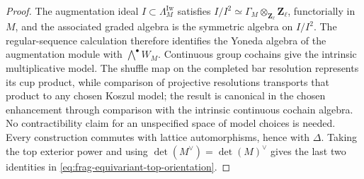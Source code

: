 \documentclass[11pt]{article}
\theoremstyle{definition}
\theoremstyle{remark}
\begin{document}
\begin{proof}
The augmentation ideal $I\subset\Lambda_M^{\mathrm{Iw}}$ satisfies
$I/I^2\simeq\Gamma_M\otimes_{\mathbf Z_\ell}\mathbf Z_\ell$, functorially in
$M$, and the associated graded algebra is the symmetric algebra on $I/I^2$.
The regular-sequence calculation therefore identifies the Yoneda algebra of
the augmentation module with $\bigwedge^\bullet W_M$.  Continuous group
cochains give the intrinsic multiplicative model.  The shuffle map on the
completed bar resolution represents its cup product, while comparison of
projective resolutions transports that product to any chosen Koszul model;
the result is canonical in the chosen enhancement through comparison
with the intrinsic continuous cochain algebra.  No contractibility
claim for an unspecified space of model choices is needed.  Every construction commutes with lattice automorphisms, hence with
$\Delta$.  Taking the top exterior power and using
$\det(M^\vee)=\det(M)^\vee$ gives the last two identities in
\eqref{eq:frag-equivariant-top-orientation}.
\end{proof}
\end{document}
